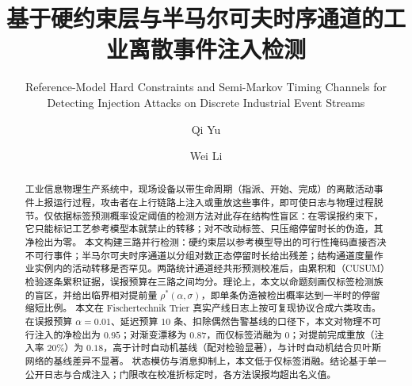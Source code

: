 \documentclass[manuscript,screen,review]{acmart}
\begin{document}
\title[离散事件注入攻击检测]{基于硬约束层与半马尔可夫时序通道的工业离散事件注入检测}
\subtitle{Reference-Model Hard Constraints and Semi-Markov Timing Channels for Detecting Injection Attacks on Discrete Industrial Event Streams}

\author{Qi Yu}


\author{Wei Li}



\begin{abstract}
工业信息物理生产系统中，现场设备以带生命周期（指派、开始、完成）的离散活动事件上报运行过程，攻击者在上行链路上注入或重放这些事件，即可使日志与物理过程脱节。仅依据标签预测概率设定阈值的检测方法对此存在结构性盲区：在零误报约束下，它只能标记工艺参考模型本就禁止的转移；对不改动标签、只压缩停留时长的伪造，其净检出为零。
本文构建三路并行检测：硬约束层以参考模型导出的可行性掩码直接否决不可行事件；半马尔可夫时序通道以分组对数正态停留时长给出残差；结构通道度量作业实例内的活动转移是否罕见。两路统计通道经共形预测校准后，由累积和（CUSUM）检验逐条累积证据，误报预算在三路之间均分。理论上，本文以命题刻画仅标签检测族的盲区，并给出临界相对提前量 $\rho^*(\alpha,\sigma)$，即单条伪造被检出概率达到一半时的停留缩短比例。
本文在 Fischertechnik Trier 真实产线日志上按可复现协议合成六类攻击。在误报预算 $\alpha=0.01$、延迟预算 $10$ 条、扣除偶然告警基线的口径下，本文对物理不可行注入的净检出为 $0.95$；对渐变漂移为 $0.87$，而仅标签消融为 $0$；对提前完成重放（注入率 $20\%$）为 $0.18$，高于计时自动机基线（配对检验显著），与计时自动机结合贝叶斯网络的基线差异不显著。
状态模仿与消息抑制上，本文低于仅标签消融。结论基于单一公开日志与合成注入；门限改在校准折标定时，各方法误报均超出名义值。
\end{abstract}
\end{document}
